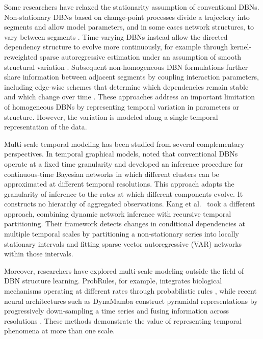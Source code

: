 \documentclass[sigconf]{acmart}
\begin{document}
Some researchers have relaxed the stationarity assumption of conventional DBNs. Non-stationary DBNs based on change-point processes divide a trajectory into segments and allow model parameters, and in some cases network structures, to vary between segments \citep{grzegorczyk_nonstationary_2009}. Time-varying DBNs instead allow the directed dependency structure to evolve more continuously, for example through kernel-reweighted sparse autoregressive estimation under an assumption of smooth structural variation \citep{song_timevarying_2009}. Subsequent non-homogeneous DBN formulations further share information between adjacent segments by coupling interaction parameters, including edge-wise schemes that determine which dependencies remain stable and which change over time \citep{kamalabad_nonhomogeneous_2020}. These approaches address an important limitation of homogeneous DBNs by representing temporal variation in parameters or structure. However, the variation is modeled along a single temporal representation of the data.

Multi-scale temporal modeling has been studied from several complementary perspectives. In temporal graphical models, \citet{saria_reasoning_2007} noted that conventional DBNs operate at a fixed time granularity and developed an inference procedure for continuous-time Bayesian networks in which different clusters can be approximated at different temporal resolutions. This approach adapts the granularity of inference to the rates at which different components evolve. It constructs no hierarchy of aggregated observations. Kang et al.~\citep{kang_multiscale_2022} took a different approach, combining dynamic network inference with recursive temporal partitioning. Their framework detects changes in conditional dependencies at multiple temporal scales by partitioning a non-stationary series into locally stationary intervals and fitting sparse vector autoregressive (VAR) networks within those intervals.

Moreover, researchers have explored multi-scale modeling outside the field of DBN structure learning. ProbRules, for example, integrates biological mechanisms operating at different rates through probabilistic rules \citep{gross_multiscale_2019}, while recent neural architectures such as DynaMamba construct pyramidal representations by progressively down-sampling a time series and fusing information across resolutions \citep{chen_dynamamba_2026}. These methods demonstrate the value of representing temporal phenomena at more than one scale.
\end{document}
